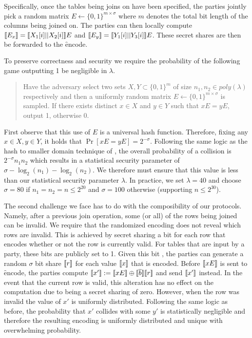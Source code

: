 Specifically, once the tables being joins on have been specified, the parties jointly pick a random matrix $E\gets\{0,1\}^{m\times \sigma}$ where $m$ denotes the total bit length of the columns being joined on. The parties can then locally compute $\llbracket E_x\rrbracket=\llbracket X_1[i] || X_2[i]\rrbracket E$ and $\llbracket E_y\rrbracket=\llbracket Y_1[i] || Y_3[i]\rrbracket E$. These secret shares are then be forwarded to the \f{encode}.

To preserve correctness and security we require the probability of the following game outputting 1 be negligible in $\lambda$. 
\begin{quote}
Have the adversary select two sets $X,Y\subset \{0,1\}^{m}$ of size $n_1,n_2\in poly(\lambda)$  respectively and then a uniformly random matrix $E\gets \{0,1\}^{m\times \sigma}$ is sampled. If there exists distinct $x\in X$ and $y\in Y$ such that $xE = yE$, output 1, otherwise 0. 
\end{quote}

First observe that this use of $E$ is a universal hash function. Therefore, fixing any $x\in X, y\in Y$, it holds that $\Pr[xE=yE]=2^{-\sigma}$. Following the same logic as the hash to smaller domain technique of \cite{usenix:PSZ14,CLR17}, the overall probability of a collision is $2^{-\sigma}n_1n_2$ which results in a statistical security parameter of $\sigma -\log_2(n_1)-\log_2(n_2)$. We therefore must ensure that this value is less than our statistical  security parameter $\lambda$. In practice, we set $\lambda=40$ and choose $\sigma =80$ if $n_1=n_2=n\leq 2^{20}$ and $\sigma=100$ otherwise (supporting $n\leq 2^{30}$). 



The second challenge we face has to do with the composibility of our protocols. Namely, after a previous join operation, some (or all) of the rows being joined can be invalid. We require that the randomized encoding does not reveal which rows are invalid. This is achieved by secret sharing a bit for each row that encodes whether or not the row is currently valid. For tables that are input by a party, these bits are publicly set to 1. Given this bit , the parties can generate a random $\sigma$ bit share $\llbracket r\rrbracket$ for each value $\llbracket x\rrbracket$ that is encoded. Before $\llbracket xE\rrbracket$ is sent to \f{encode}, the parties compute $\llbracket x'\rrbracket:=\llbracket xE\rrbracket\oplus \llbracket \overline{b}\rrbracket\llbracket r\rrbracket$ and send $\llbracket x'\rrbracket$ instead. In the event that the current row is valid, this alteration has no effect on the computation due to  being a secret sharing of zero. However, when the row was invalid the value of $x'$ is uniformly distributed. Following the same logic as before, the probability that $x'$ collides with some $y'$ is statistically negligible and therefore the resulting encoding is uniformly distributed and unique with overwhelming probability. 

